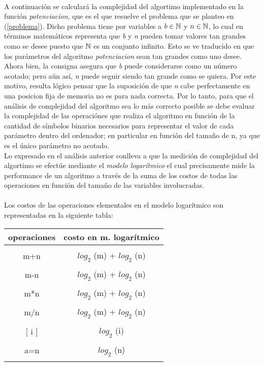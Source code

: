 \paragraph{}
A continuación se calculará la complejidad del algortimo implementado en la función \textit{potenciacion}, que es el que resuelve el problema que se planteo en (\ref{problema}). Dicho problema tiene por variables a $b \in \mathbb{N}$ y $n \in \mathbb{N}$, lo cual en términos matemáticos representa que \textit{b} y \textit{n} pueden tomar valores tan grandes como se desee puesto que $\mathbb{N}$ es un conjunto infinito. Esto se ve traducido en que los parámetros del algoritmo \textit{potenciacion} sean tan grandes como uno desee. \\
Ahora bien, la consigna asegura que \textit{b} puede considerarse como un número acotado; pero aún así, \textit{n} puede seguir siendo tan grande como se quiera. Por este motivo, resulta lógico pensar que la suposición de que \textit{n} cabe perfectamente en una posicion fija de memoria no es para nada correcta. Por lo tanto, para que el análisis de complejidad del algoritmo sea lo más correcto posible se debe evaluar la complejidad de las operaciónes que realiza el algoritmo en función de la cantidad de símbolos binarios necesarios para representar el valor de cada parámetro dentro del ordenador; en particular en función del tamaño de n, ya que es el único parámetro no acotado.\\
Lo expresado en el análisis anterior conlleva a que la medición de complejidad del algortimo se efectúe mediante el \textit{modelo logarítmico} el cual precisamente mide la performance de un algoritmo a través de la suma de los costos de todas las operaciones en función del tamaño de las variables involucradas.

\paragraph{}
Los costos de las operaciones elementales en el modelo logarítmico son representadas en la siguiente tabla: \\
	\begin{center}
		\begin{tabular}{|c|c|}
			\hline
			operaciones & costo en m. logarítmico \\ 
			\hline
			& \\
			m+n & $log_2$ (m) + $log_2$ (n) \\
			& \\
			m-n & $log_2$ (m) + $log_2$ (n) \\
			& \\
			m*n & $log_2$ (m) + $log_2$ (n) \\
			& \\
			m/n & $log_2$ (m) + $log_2$ (n) \\
			& \\
			$[$ i $]$ & $log_2$ (i) \\
			& \\
			a=n & $log_2$ (n) \\
			& \\
			\hline
		\end{tabular} 
	\end{center}


